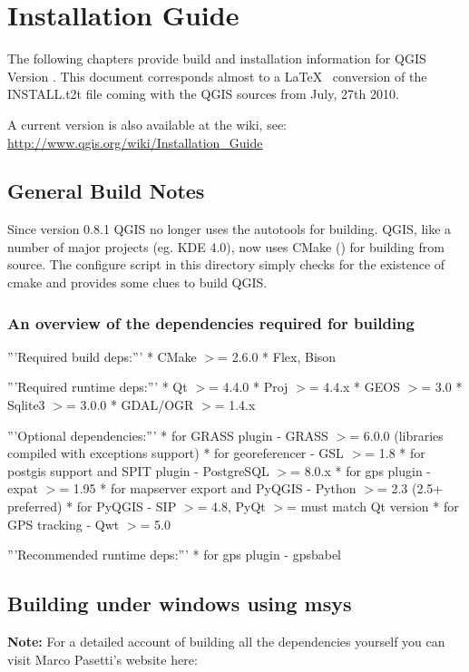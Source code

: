
\section{Installation Guide}\label{label_install}


The following chapters provide build and installation information for QGIS
Version \CURRENT. This document corresponds almost to a \LaTeX~ conversion of
the INSTALL.t2t file coming with the QGIS sources from July, 27th 2010.

A current version is also available at the wiki, see:
\url{http://www.qgis.org/wiki/Installation_Guide}

\hypertarget{toc2}{}
\subsection{General Build Notes}
Since version 0.8.1 QGIS no longer uses the autotools for building. QGIS, like a
number of major projects (eg. KDE 4.0), now uses CMake ()
for building from source. The configure script in this directory simply checks
for the existence of cmake and provides some clues to build QGIS.

\hypertarget{toc3}{}
\subsubsection{An overview of the dependencies required for building}
'''Required build deps:'''
* CMake $>$= 2.6.0
* Flex, Bison

'''Required runtime deps:'''
* Qt $>$= 4.4.0
* Proj $>$= 4.4.x
* GEOS $>$= 3.0
* Sqlite3 $>$= 3.0.0
* GDAL/OGR $>$= 1.4.x

'''Optional dependencies:'''
* for GRASS plugin - GRASS $>$= 6.0.0 (libraries compiled with exceptions support)
* for georeferencer - GSL $>$= 1.8
* for postgis support and SPIT plugin - PostgreSQL $>$= 8.0.x
* for gps plugin - expat $>$= 1.95
* for mapserver export and PyQGIS - Python $>$= 2.3 (2.5+ preferred)
* for PyQGIS - SIP $>$= 4.8, PyQt $>$= must match Qt version
* for GPS tracking - Qwt $>$= 5.0

'''Recommended runtime deps:'''
* for gps plugin - gpsbabel


\hypertarget{toc4}{}
\subsection{Building under windows using msys}
\textbf{Note:} For a detailed account of building all the dependencies yourself you 
can visit Marco Pasetti's website here:

